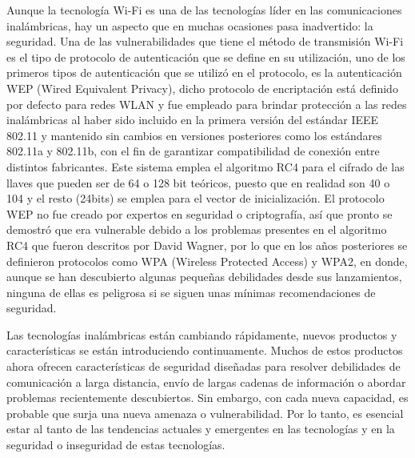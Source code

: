 Aunque la tecnología Wi-Fi es una de las tecnologías líder en las comunicaciones inalámbricas, hay un aspecto que en muchas ocasiones pasa inadvertido: la seguridad. Una de las vulnerabilidades que tiene el método de transmisión Wi-Fi es el tipo de protocolo de autenticación que se define en su utilización\cite{CorlettiEstrada2011SeguridadNiveles}, uno de los primeros tipos de autenticación que se utilizó en el protocolo, es la autenticación WEP (Wired Equivalent Privacy), dicho protocolo de encriptación está definido por defecto para redes WLAN y fue empleado para brindar protección a las redes inalámbricas al haber sido incluido en la primera versión del estándar IEEE 802.11 y mantenido sin cambios en versiones posteriores como los estándares 802.11a y 802.11b, con el fin  de garantizar compatibilidad de conexión entre distintos fabricantes\cite{Lehembre2006SeguridadWPA2}. Este sistema emplea el algoritmo RC4 para el cifrado de las llaves que pueden ser de 64 o 128 bit teóricos, puesto que en realidad son 40 o 104 y el resto (24bits) se emplea para el vector de inicialización. El protocolo WEP no fue creado por expertos en seguridad o criptografía, así que pronto se demostró que era vulnerable debido a los problemas presentes en el algoritmo RC4 que fueron descritos por David Wagner, por lo que en los años posteriores se definieron protocolos como WPA (Wireless Protected Access) y WPA2\cite{Lehembre2006SeguridadWPA2}, en donde, aunque se han descubierto algunas pequeñas debilidades desde sus lanzamientos, ninguna de ellas es peligrosa si se siguen unas mínimas recomendaciones de seguridad.  

Las tecnologías inalámbricas están cambiando rápidamente, nuevos productos y características se están introduciendo continuamente. Muchos de estos productos ahora ofrecen características de seguridad diseñadas para resolver debilidades de comunicación a larga distancia, envío de largas cadenas de información o abordar problemas recientemente descubiertos. Sin embargo, con cada nueva capacidad, es probable que surja una nueva amenaza o vulnerabilidad. Por lo tanto, es esencial estar al tanto de las tendencias actuales y emergentes en las tecnologías y en la seguridad o inseguridad de estas tecnologías. 

